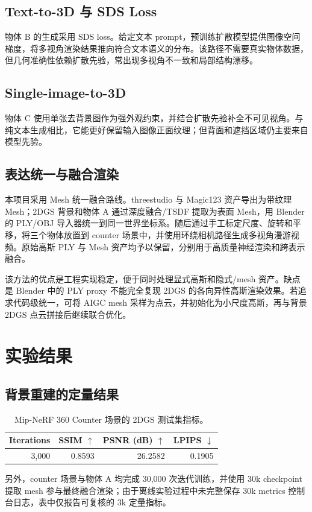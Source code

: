 \documentclass[10pt]{ctexart}
\begin{document}
\subsection{Text-to-3D 与 SDS Loss}
物体 B 的生成采用 SDS loss。给定文本 prompt，预训练扩散模型提供图像空间梯度，将多视角渲染结果推向符合文本语义的分布。该路径不需要真实物体数据，但几何准确性依赖扩散先验，常出现多视角不一致和局部结构漂移。

\subsection{Single-image-to-3D}
物体 C 使用单张去背景图作为强外观约束，并结合扩散先验补全不可见视角。与纯文本生成相比，它能更好保留输入图像正面纹理；但背面和遮挡区域仍主要来自模型先验。

\subsection{表达统一与融合渲染}
本项目采用 Mesh 统一融合路线。threestudio 与 Magic123 资产导出为带纹理 Mesh；2DGS 背景和物体 A 通过深度融合/TSDF 提取为表面 Mesh，用 Blender 的 PLY/OBJ 导入器统一到同一世界坐标系。随后通过手工标定尺度、旋转和平移，将三个物体放置到 counter 场景中，并使用环绕相机路径生成多视角漫游视频。原始高斯 PLY 与 Mesh 资产均予以保留，分别用于高质量神经渲染和跨表示融合。

该方法的优点是工程实现稳定，便于同时处理显式高斯和隐式/mesh 资产。缺点是 Blender 中的 PLY proxy 不能完全复现 2DGS 的各向异性高斯渲染效果。若追求代码级统一，可将 AIGC mesh 采样为点云，并初始化为小尺度高斯，再与背景 2DGS 点云拼接后继续联合优化。

\section{实验结果}
\subsection{背景重建的定量结果}
\begin{table}[H]
\centering
\caption{Mip-NeRF 360 Counter 场景的 2DGS 测试集指标。}
\begin{tabular}{rrrr}
\toprule
Iterations & SSIM $\uparrow$ & PSNR (dB) $\uparrow$ & LPIPS $\downarrow$ \\
\midrule
3,000 & 0.8593 & 26.2582 & 0.1905 \\
\bottomrule
\end{tabular}
\end{table}
另外，counter 场景与物体 A 均完成 30,000 次迭代训练，并使用 30k checkpoint 提取 mesh 参与最终融合渲染；由于离线实验过程中未完整保存 30k metrics 控制台日志，表中仅报告可复核的 3k 定量指标。
\end{document}
